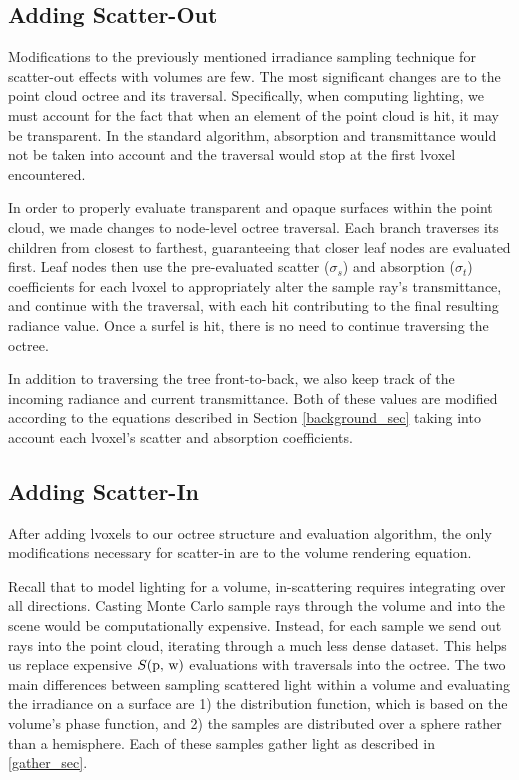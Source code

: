 \documentclass[runningheads]{llncs}
\begin{document}
\subsection{Adding Scatter-Out}
\label{scatterout_sec}
Modifications to the previously mentioned irradiance sampling technique for scatter-out effects with volumes are few.  The most significant changes are to the point cloud octree and its traversal.  Specifically, when computing lighting, we must account for the fact that when an element of the point cloud is hit, it may be transparent.  In the standard algorithm, absorption and transmittance would not be taken into account and the traversal would stop at the first lvoxel encountered.

In order to properly evaluate transparent and opaque surfaces within the point cloud, we made changes to node-level octree traversal.  Each branch traverses its children from closest to farthest, guaranteeing that closer leaf nodes are evaluated first.  Leaf nodes then use the pre-evaluated scatter ($\sigma_{s}$) and absorption ($\sigma_{t}$) coefficients for each lvoxel to appropriately alter the sample ray's transmittance, and continue with the traversal, with each hit contributing to the final resulting radiance value.  Once a surfel is hit, there is no need to continue traversing the octree.

In addition to traversing the tree front-to-back, we also keep track of the incoming radiance and current transmittance.  Both of these values are modified according to the equations described in Section \ref{background_sec} taking into account each lvoxel's scatter and absorption coefficients.


\subsection{Adding Scatter-In}
\label{scatterin_sec}
After adding lvoxels to our octree structure and evaluation algorithm, the only modifications necessary for scatter-in are to the volume rendering equation.

Recall that to model lighting for a volume, in-scattering requires integrating over all directions.  Casting Monte Carlo sample rays through the volume and into the scene would be computationally expensive.  Instead, for each sample we send out rays into the point cloud, iterating through a much less dense dataset.  This helps us replace expensive $S(\textup{p, w})$ evaluations with traversals into the octree.  The two main differences between sampling scattered light within a volume and evaluating the irradiance on a surface are 1) the distribution function, which is based on the volume's phase function, and 2) the samples are distributed over a sphere rather than a hemisphere.  Each of these samples gather light as described in \ref{gather_sec}.
\end{document}
